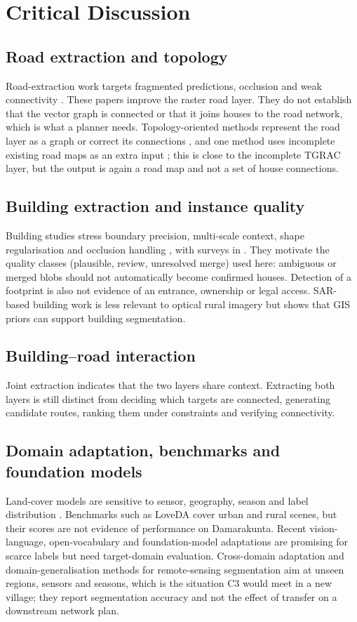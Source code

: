 \documentclass[12pt,a4paper]{report}
\begin{document}



\section{Critical Discussion}
\subsection{Road extraction and topology}
Road-extraction work targets fragmented predictions, occlusion and weak connectivity \cite{L12,L16,L20,L29,L30,L36,L37,L38}. These papers improve the raster road layer. They do not establish that the vector graph is connected or that it joins houses to the road network, which is what a planner needs. Topology-oriented methods represent the road layer as a graph or correct its connections \cite{L37,L38}, and one method uses incomplete existing road maps as an extra input \cite{L39}; this is close to the incomplete TGRAC layer, but the output is again a road map and not a set of house connections.

\subsection{Building extraction and instance quality}
Building studies stress boundary precision, multi-scale context, shape regularisation and occlusion handling \cite{L03,L04,L06,L07,L08,L14,L22}, with surveys in \cite{L17}. They motivate the quality classes (plausible, review, unresolved merge) used here: ambiguous or merged blobs should not automatically become confirmed houses. Detection of a footprint is also not evidence of an entrance, ownership or legal access. SAR-based building work \cite{L05,L21} is less relevant to optical rural imagery but shows that GIS priors can support building segmentation.

\subsection{Building--road interaction}
Joint extraction \cite{L19} indicates that the two layers share context. Extracting both layers is still distinct from deciding which targets are connected, generating candidate routes, ranking them under constraints and verifying connectivity.

\subsection{Domain adaptation, benchmarks and foundation models}
Land-cover models are sensitive to sensor, geography, season and label distribution \cite{L11}. Benchmarks such as LoveDA \cite{F05} cover urban and rural scenes, but their scores are not evidence of performance on Damarakunta. Recent vision-language, open-vocabulary and foundation-model adaptations \cite{L24,L33,L34,L35} are promising for scarce labels but need target-domain evaluation. Cross-domain adaptation and domain-generalisation methods for remote-sensing segmentation \cite{L43,L44,L45} aim at unseen regions, sensors and seasons, which is the situation C3 would meet in a new village; they report segmentation accuracy and not the effect of transfer on a downstream network plan.
\end{document}
